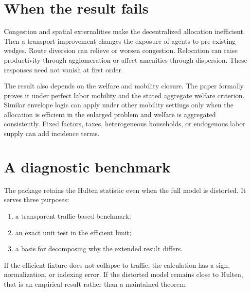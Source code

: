 \section{When the result fails}

Congestion and spatial externalities make the decentralized allocation
inefficient. Then a transport improvement changes the exposure of agents to
pre-existing wedges. Route diversion can relieve or worsen congestion.
Relocation can raise productivity through agglomeration or affect amenities
through dispersion. These responses need not vanish at first order.

The result also depends on the welfare and mobility closure. The paper
formally proves it under perfect labor mobility and the stated aggregate
welfare criterion. Similar envelope logic can apply under other mobility
settings only when the allocation is efficient in the enlarged problem and
welfare is aggregated consistently. Fixed factors, taxes, heterogeneous
households, or endogenous labor supply can add incidence terms.

\section{A diagnostic benchmark}

The package retains the Hulten statistic even when the full model is
distorted. It serves three purposes:
\begin{enumerate}
  \item a transparent traffic-based benchmark;
  \item an exact unit test in the efficient limit;
  \item a basis for decomposing why the extended result differs.
\end{enumerate}

If the efficient fixture does not collapse to traffic, the calculation has a
sign, normalization, or indexing error. If the distorted model remains close
to Hulten, that is an empirical result rather than a maintained theorem.

